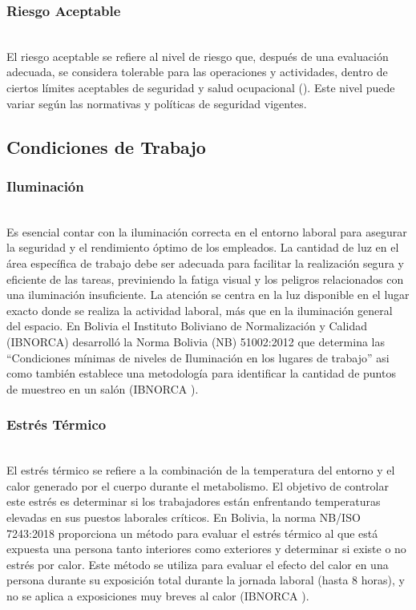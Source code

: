 \subsubsection{Riesgo Aceptable}\hfill\\
\indent
El riesgo aceptable se refiere al nivel de riesgo que, después de una evaluación adecuada, se considera tolerable para las operaciones y actividades, dentro de ciertos límites aceptables de seguridad y salud ocupacional (\cite{iso45001}). Este nivel puede variar según las normativas y políticas de seguridad vigentes.

\subsection{Condiciones de Trabajo}

\subsubsection{Iluminación}\hfill\\
\indent
Es esencial contar con la iluminación correcta en el entorno laboral para asegurar la seguridad y el rendimiento óptimo de los empleados. La cantidad de luz en el área específica de trabajo debe ser adecuada para facilitar la realización segura y eficiente de las tareas, previniendo la fatiga visual y los peligros relacionados con una iluminación insuficiente. La atención se centra en la luz disponible en el lugar exacto donde se realiza la actividad laboral, más que en la iluminación general del espacio. En Bolivia el Instituto Boliviano de Normalización y Calidad (IBNORCA) desarrolló la Norma Bolivia (NB) 51002:2012 que determina las ``Condiciones mínimas de niveles de Iluminación en los lugares de trabajo'' asi como también establece una metodología para identificar la cantidad de puntos de muestreo en un salón (IBNORCA \citeyear{NB51002}).

\subsubsection{Estrés Térmico}\hfill\\
\indent
El estrés térmico se refiere a la combinación de la temperatura del entorno y el calor generado por el cuerpo durante el metabolismo. El objetivo de controlar este estrés es determinar si los trabajadores están enfrentando temperaturas elevadas en sus puestos laborales críticos. En Bolivia, la norma NB/ISO 7243:2018 proporciona un método para evaluar el estrés térmico al que está expuesta una persona tanto interiores como exteriores y determinar si existe o no estrés por calor. Este método se utiliza para evaluar el efecto del calor en una persona durante su exposición total durante la jornada laboral (hasta 8 horas), y no se aplica a exposiciones muy breves al calor (IBNORCA \citeyear{NB7243}). 

